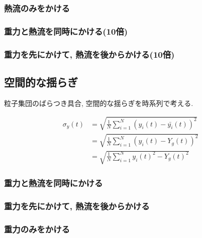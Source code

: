 

\subsubsection{熱流のみをかける}



\subsubsection{重力と熱流を同時にかける(10倍)}



\subsubsection{重力を先にかけて, 熱流を後からかける(10倍)}



\subsection{空間的な揺らぎ}

粒子集団のばらつき具合, 空間的な揺らぎを時系列で考える.

\begin{align}
  \sigma_{y} (t)
  &= \sqrt{\frac{1}{N} \sum_{i=1}^{N} (y_i (t) - \bar{y_i}(t) )^2} \\
  &= \sqrt{\frac{1}{N} \sum_{i=1}^{N} (y_i (t) - Y_g (t) )^2} \\
  &= \sqrt{\frac{1}{N} \sum_{i=1}^{N} {{y_i} (t)}^2 - {{Y_g} (t)}^2}
\end{align}

\subsubsection{重力と熱流を同時にかける}



\subsubsection{重力を先にかけて, 熱流を後からかける}



\subsubsection{重力のみをかける}

